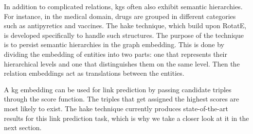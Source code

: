 In addition to complicated relations, \acp{kg} often also exhibit semantic hierarchies.
For instance, in the medical domain, drugs are grouped in different categories such as antipyretics and vaccines.
The \ac{hake} technique\cite{Zhang2019}, which build upon RotatE, is developed specifically to handle such structures.
The purpose of the technique is to persist semantic hierarchies in the graph embedding.
This is done by dividing the embedding of entities into two parts: one that represents their hierarchical levels and one that distinguishes them on the same level.
Then the relation embeddings act as translations between the entities.

A \ac{kg} embedding can be used for link prediction by passing candidate triples through the score function.
The triples that get assigned the highest scores are most likely to exist.
The \ac{hake} technique currently produces state-of-the-art results for this link prediction task, which is why we take a closer look at it in the next section.
